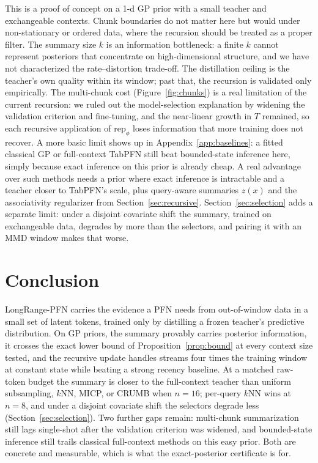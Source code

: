 \documentclass{article}
\newcommand{\rep}{\mathrm{rep}}
\begin{document}
This is a proof of concept on a 1-d GP prior with a small teacher and
exchangeable contexts. Chunk boundaries do not matter here but would under
non-stationary or ordered data, where the recursion should be treated as a
proper filter. The summary size $k$ is an information bottleneck: a finite
$k$ cannot represent posteriors that concentrate on high-dimensional
structure, and we have not characterized the rate--distortion trade-off.
The distillation ceiling is the teacher's own quality within its window;
past that, the recursion is validated only empirically. The multi-chunk
cost (Figure~\ref{fig:chunks}) is a real limitation of the current
recursion: we ruled out the model-selection explanation by widening the
validation criterion and fine-tuning, and the near-linear growth in $T$
remained, so each recursive application of $\rep_\phi$ loses information
that more training does not recover. A more basic limit shows up
in Appendix~\ref{app:baselines}: a fitted classical GP or full-context
TabPFN still beat bounded-state inference here, simply because exact
inference on this prior is already cheap. A real advantage over such
methods needs a prior where exact inference is intractable and a teacher
closer to TabPFN's scale, plus query-aware summaries $z(x)$ and the
associativity regularizer from Section~\ref{sec:recursive}.
Section~\ref{sec:selection} adds a separate limit: under a disjoint
covariate shift the summary, trained on exchangeable data, degrades by more
than the selectors, and pairing it with an MMD window makes that worse.

\section{Conclusion}
\label{sec:conclusion}


LongRange-PFN carries the evidence a PFN needs from out-of-window data in a
small set of latent tokens, trained only by distilling a frozen teacher's
predictive distribution. On GP priors, the summary provably carries
posterior information, it crosses the exact lower bound of
Proposition~\ref{prop:bound} at every context size tested, and the
recursive update handles streams four times the training window at
constant state while beating a strong recency baseline. At a matched
raw-token budget the summary is closer to the full-context teacher than
uniform subsampling, $k$NN, MICP, or CRUMB when $n = 16$; per-query $k$NN
wins at $n = 8$, and under a disjoint covariate shift the selectors degrade
less (Section~\ref{sec:selection}). Two further gaps remain: multi-chunk
summarization still lags single-shot after the validation criterion was
widened, and bounded-state inference still trails classical full-context
methods on this easy prior. Both are concrete and measurable, which is
what the exact-posterior certificate is for.
\end{document}
